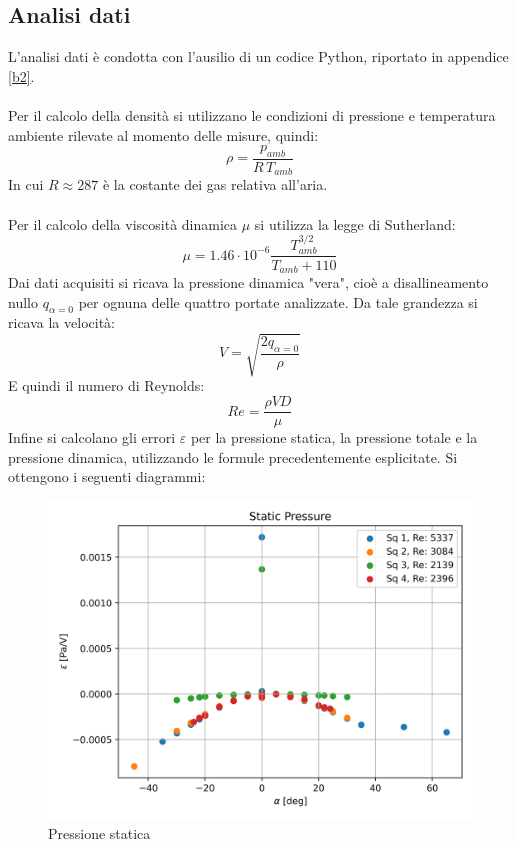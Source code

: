 \subsection{Analisi dati}
L'analisi dati è condotta con l'ausilio di un codice Python, riportato in appendice \ref{b2}.\\\\
Per il calcolo della densità si utilizzano le condizioni di pressione e temperatura ambiente rilevate al momento delle misure, quindi:
\begin{equation*}
    \rho = \frac{p_{amb}}{R\,T_{amb}}
\end{equation*}
In cui $R\approx 287$ è la costante dei gas relativa all'aria.\\\\
Per il calcolo della viscosità dinamica $\mu$ si utilizza la legge di Sutherland:
\begin{equation*}
    \mu = 1.46\cdot10^{-6} \frac{T_{amb}^{3/2}}{T_{amb}+110}
\end{equation*}
Dai dati acquisiti si ricava la pressione dinamica "vera", cioè a disallineamento nullo $q_{\alpha=0}$ per ognuna delle quattro portate analizzate. Da tale grandezza si ricava la velocità:
\begin{equation*}
    V = \sqrt{\frac{2q_{\alpha=0}}{\rho}}
\end{equation*}
E quindi il numero di Reynolds:
\begin{equation*}
    Re = \frac{\rho V D}{\mu}
\end{equation*}
Infine si calcolano gli errori $\varepsilon$ per la pressione statica, la pressione totale e la pressione dinamica, utilizzando le formule precedentemente esplicitate.
\newpage
\noindent Si ottengono i seguenti diagrammi:
\begin{figure}[h!]
    \centering
    \includegraphics[width=.76\textwidth]{images/2/p.png}
    \caption{Pressione statica}
\end{figure}
